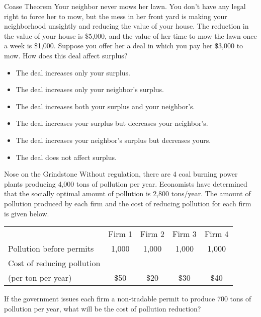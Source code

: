 \documentclass{beamer}
\begin{document}
\begin{frame}{Coase Theorem}
    Your neighbor never mows her lawn. You don’t have any legal right to force her to mow, but the mess in her front yard is making your neighborhood unsightly and reducing the value of your house. The reduction in the value of your house is \$5,000, and the value of her time to mow the lawn once a week is \$1,000. Suppose you offer her a deal in which you pay her \$3,000 to mow. How does this deal affect surplus?
    \begin{itemize}
        \item The deal increases only your surplus.
        \item The deal increases only your neighbor’s surplus.
        \item The deal increases both your surplus and your neighbor’s.
        \item The deal increases your surplus but decreases your neighbor’s.
        \item The deal increases your neighbor’s surplus but decreases yours.
        \item The deal does not affect surplus.
    \end{itemize}
\end{frame}

\begin{frame}{Nose on the Grindstone}
    Without regulation, there are 4 coal burning power plants producing 4,000 tons of pollution per year. Economists have determined that the socially optimal amount of pollution is 2,800 tons/year. The amount of pollution produced by each firm and the cost of reducing pollution for each firm is given below.
    \begin{table}[H]
    \centering
    \begin{tabular}{lcccc}
                                                  & Firm 1 & Firm 2 & Firm 3 & Firm 4 \\
    Pollution before permits                      & 1,000  & 1,000  & 1,000  & 1,000  \\ \hline
    Cost of reducing pollution \\(per ton per year) & \$50   & \$20   & \$30   & \$40  
    \end{tabular}
    \end{table}
    If the government issues each firm a non-tradable permit to produce 700 tons of pollution per year, what will be the cost of pollution reduction?
\end{frame}
\end{document}
